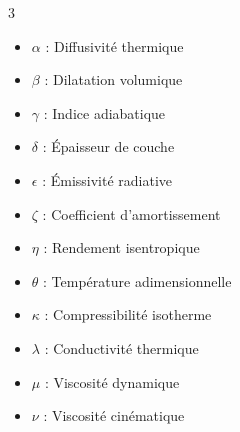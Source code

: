 \setlength{\columnsep}{16pt}
\begin{multicols}{3}
  \begin{itemize}[leftmargin=12pt]
    \item $\alpha$ : Diffusivité thermique
    \item $\beta$ : Dilatation volumique
    \item $\gamma$ : Indice adiabatique
    \item $\delta$ : Épaisseur de couche
    \item $\epsilon$ : Émissivité radiative
    \item $\zeta$ : Coefficient d'amortissement
    \item $\eta$ : Rendement isentropique
    \item $\theta$ : Température adimensionnelle
    \item $\kappa$ : Compressibilité isotherme
    \item $\lambda$ : Conductivité thermique
    \item $\mu$ : Viscosité dynamique
    \item $\nu$ : Viscosité cinématique
  \end{itemize}
\end{multicols}


